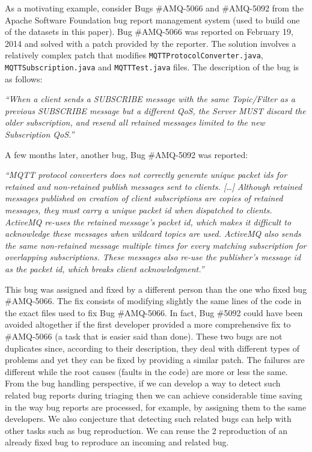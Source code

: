 \documentclass[12pt]{report}
\begin{document}
As a motivating example, consider Bugs \#AMQ-5066 and \#AMQ-5092 from
the Apache Software Foundation bug report management system (used to
build one of the datasets in this paper). Bug \#AMQ-5066 was reported on
February 19, 2014 and solved with a patch provided by the reporter. The
solution involves a relatively complex patch that modifies
\lstinline!MQTTProtocolConverter.java!,
\lstinline!MQTTSubscription.java! and \lstinline!MQTTTest.java! files.
The description of the bug is as follows:

\emph{``When a client sends a SUBSCRIBE message with the same
Topic/Filter as a previous SUBSCRIBE message but a different QoS, the
Server MUST discard the older subscription, and resend all retained
messages limited to the new Subscription QoS.''}

A few months later, another bug, Bug \#AMQ-5092 was reported:

\emph{``MQTT protocol converters does not correctly generate unique
packet ids for retained and non-retained publish messages sent to
clients. {[}\ldots{}{]} Although retained messages published on creation
of client subscriptions are copies of retained messages, they must carry
a unique packet id when dispatched to clients. ActiveMQ re-uses the
retained message's packet id, which makes it difficult to acknowledge
these messages when wildcard topics are used. ActiveMQ also sends the
same non-retained message multiple times for every matching subscription
for overlapping subscriptions. These messages also re-use the
publisher's message id as the packet id, which breaks client
acknowledgment.''}

This bug was assigned and fixed by a different person than the one who
fixed bug \#AMQ-5066. The fix consists of modifying slightly the same
lines of the code in the exact files used to fix Bug \#AMQ-5066. In
fact, Bug \#5092 could have been avoided altogether if the first
developer provided a more comprehensive fix to \#AMQ-5066 (a task that
is easier said than done). These two bugs are not duplicates since,
according to their description, they deal with different types of
problems and yet they can be fixed by providing a similar patch. The
failures are different while the root causes (faults in the code) are
more or less the same. From the bug handling perspective, if we can
develop a way to detect such related bug reports during triaging then we
can achieve considerable time saving in the way bug reports are
processed, for example, by assigning them to the same developers. We
also conjecture that detecting such related bugs can help with other
tasks such as bug reproduction. We can reuse the 2 reproduction of an
already fixed bug to reproduce an incoming and related bug.
\end{document}
